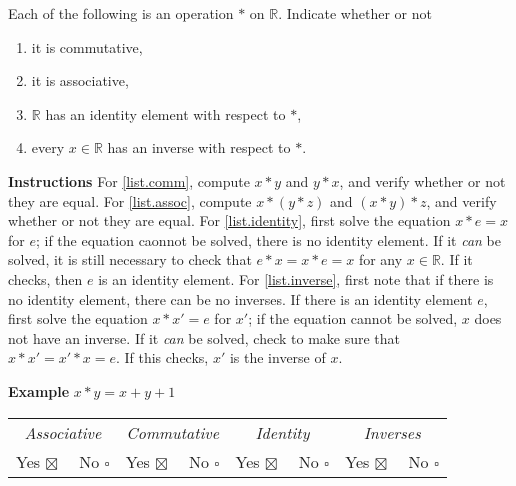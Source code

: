 \documentclass[twoside]{amsart}
\newcommand{\Reals}{\mathbb{R}{}}
\newcommand{\brk}{\vspace{5pt}}
\begin{document}
\brk \noindent Each of the following is an operation $*$ on
$\Reals$. Indicate whether or not

\begin{enumerate}[label=\protect{(\roman*)}]
\item \label{list.comm} it is commutative,
\item \label{list.assoc} it is associative,
\item \label{list.identity} $\Reals$ has an identity element with respect to
$*$,
\item \label{list.inverse} every $x \in \Reals$ has an inverse with respect to
$*$.
\end{enumerate}

\brk \noindent \textbf{Instructions} For \ref{list.comm}, compute $x * y$ and
$y * x$, and verify whether or not they are equal. For \ref{list.assoc},
compute $x * (y
* z)$ and $(x * y) * z$, and verify whether or not they are
equal. For \ref{list.identity}, first solve the equation $x * e = x$ for $e$;
if the equation caonnot be solved, there is no identity element. If it
\emph{can} be solved, it is still necessary to check that $e*x=x*e=x$ for any
$x\in \Reals$. If it checks, then $e$ is an identity element. For
\ref{list.inverse}, first note that if there is no identity element, there can
be no inverses. If there is an identity element $e$, first solve the equation
$x*x'=e$ for $x'$; if the equation cannot be solved, $x$ does not have an
inverse. If it \emph{can} be solved, check to make sure that $x*x'=x'*x=e$. If
this checks, $x'$ is the inverse of $x$. \brk

\noindent \textbf{Example} $x * y = x + y + 1$ \brk

\begin{tabular}{cccc}
  \emph{Associative} & \emph{Commutative} & \emph{Identity} &
  \emph{Inverses} \\

  Yes $\boxtimes \quad$ No $\square$ & Yes $\boxtimes \quad$ No $\square$ &
  Yes $\boxtimes \quad$ No $\square$ & Yes $\boxtimes \quad$ No $\square$ 

\end{tabular}
\end{document}
